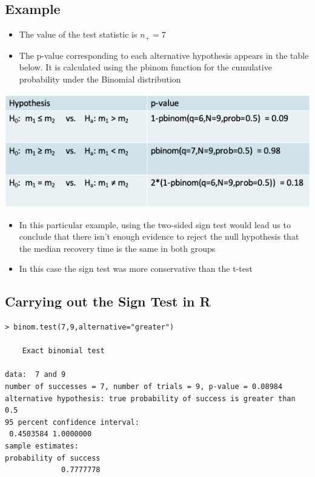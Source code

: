 \documentclass[
]{book}
\providecommand{\tightlist}{%
  \setlength{\itemsep}{0pt}\setlength{\parskip}{0pt}}
\begin{document}
\hypertarget{example-9}{%
\subsection{Example}\label{example-9}}

\begin{itemize}
\tightlist
\item
  The value of the test statistic is \(n_+ = 7\)
\item
  The p-value corresponding to each alternative hypothesis appears in the table below. It is calculated using the pbinom function for the cumulative probability under the Binomial distribution
\end{itemize}

\includegraphics[width=0.7\linewidth]{./9_14}

\begin{itemize}
\tightlist
\item
  In this particular example, using the two-sided sign test would lead us to conclude that there isn't enough evidence to reject the null hypothesis that the median recovery time is the same in both groups
\item
  In this case the sign test was more conservative than the t-test
\end{itemize}

\hypertarget{carrying-out-the-sign-test-in-r}{%
\subsection{Carrying out the Sign Test in R}\label{carrying-out-the-sign-test-in-r}}

\begin{verbatim}
> binom.test(7,9,alternative="greater")

    Exact binomial test

data:  7 and 9
number of successes = 7, number of trials = 9, p-value = 0.08984
alternative hypothesis: true probability of success is greater than 0.5
95 percent confidence interval:
 0.4503584 1.0000000
sample estimates:
probability of success 
             0.7777778 
\end{verbatim}
\end{document}
